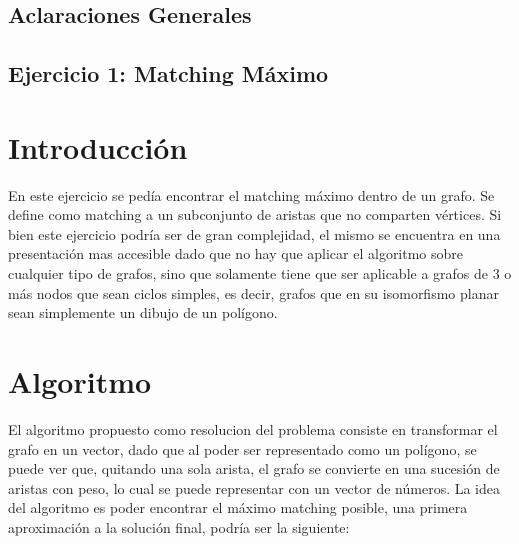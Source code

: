 \documentclass[a4paper, 12pt]{article}
\begin{document}
\begin{center}
\section*{Aclaraciones Generales}
\end{center}

\newpage
\begin{center}
\section*{Ejercicio 1: Matching M\'aximo}
\end{center}
 
\section*{Introducci\'on}
En este ejercicio se ped\'ia encontrar el matching m\'aximo dentro de un grafo. Se define como matching a un subconjunto de aristas que no comparten v\'ertices. Si bien este ejercicio podr\'ia ser de gran complejidad, el mismo se encuentra en una presentaci\'on mas accesible dado que no hay que aplicar el algoritmo sobre cualquier tipo de grafos, sino que solamente tiene que ser aplicable a grafos de 3 o m\'as nodos que sean ciclos simples, es decir, grafos que en su isomorfismo planar sean simplemente un dibujo de un pol\'igono.


\section*{Algoritmo}



El algoritmo propuesto como resolucion del problema consiste en transformar el grafo en un vector, dado que al poder ser representado como un pol\'igono, se puede ver que, quitando una sola arista, el grafo se convierte en una sucesi\'on de aristas con peso, lo cual se puede representar con un vector de n\'umeros. La idea del algoritmo es poder encontrar el m\'aximo matching posible, una primera aproximaci\'on a la soluci\'on final, podr\'ia ser la siguiente:
\end{document}

